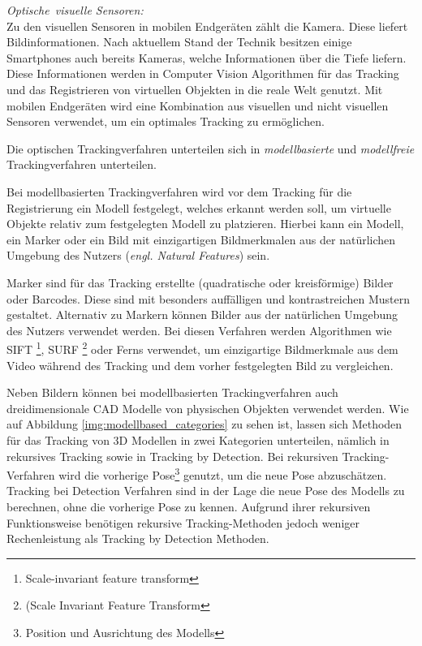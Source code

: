 \textit{Optische\ visuelle Sensoren:}\\

Zu den visuellen Sensoren in mobilen Endgeräten zählt die Kamera. Diese liefert Bildinformationen. Nach aktuellem Stand der Technik besitzen einige Smartphones auch bereits Kameras, welche Informationen über die Tiefe liefern. Diese Informationen werden in Computer Vision Algorithmen für das Tracking und das Registrieren von virtuellen Objekten in die reale Welt genutzt. Mit mobilen Endgeräten wird eine Kombination aus visuellen und nicht visuellen Sensoren verwendet, um ein optimales Tracking zu ermöglichen.


Die optischen Trackingverfahren unterteilen sich in \textit{modellbasierte} und \textit{modellfreie} Trackingverfahren unterteilen. 

Bei modellbasierten Trackingverfahren wird vor dem Tracking für die Registrierung ein Modell festgelegt, welches erkannt werden soll, um virtuelle Objekte relativ zum festgelegten Modell zu platzieren. 
Hierbei kann ein Modell, ein Marker oder ein Bild mit einzigartigen Bildmerkmalen aus der natürlichen Umgebung des Nutzers (\textit{engl. Natural Features}) sein. 

Marker sind für das Tracking erstellte (quadratische oder kreisförmige) Bilder oder Barcodes. Diese sind mit besonders auffälligen und kontrastreichen Mustern gestaltet. Alternativ zu Markern können Bilder aus der natürlichen Umgebung des Nutzers verwendet werden. Bei diesen Verfahren werden Algorithmen wie SIFT \footnote{Scale-invariant feature transform}, SURF \footnote{(Scale Invariant Feature Transform} oder Ferns verwendet, um einzigartige Bildmerkmale aus dem Video während des Tracking und dem vorher festgelegten Bild zu vergleichen.\cite{Cukovic2015}

Neben Bildern können bei modellbasierten Trackingverfahren auch dreidimensionale CAD Modelle von physischen Objekten verwendet werden. \cite{Lowney2016} Wie auf Abbildung \ref{img:modellbased_categories} zu sehen ist, lassen sich Methoden für das Tracking von 3D Modellen in zwei Kategorien unterteilen, nämlich in rekursives Tracking sowie in Tracking by Detection. Bei rekursiven Tracking-Verfahren wird die vorherige Pose\footnote{Position und Ausrichtung des Modells} genutzt, um die neue Pose abzuschätzen. Tracking bei Detection Verfahren sind in der Lage die neue Pose des Modells zu berechnen, ohne die vorherige Pose zu kennen. Aufgrund ihrer rekursiven 
Funktionsweise benötigen rekursive Tracking-Methoden jedoch weniger Rechenleistung als Tracking by Detection Methoden. 

